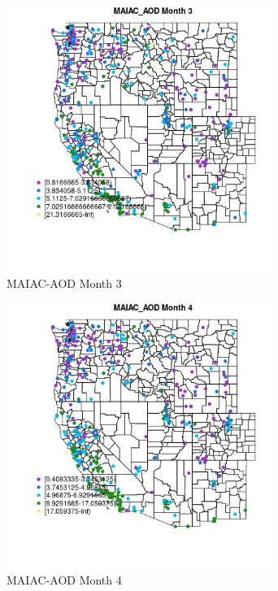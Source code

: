 \begin{figure} 
\centering  
\includegraphics[width=0.77\textwidth]{Code_Outputs/ML_input_report_ML_input_PM25_Step5_part_d_de_duplicated_aves_ML_input_MapObsMo3MAIAC_AOD.jpg} 
\caption{\label{fig:ML_input_report_ML_input_PM25_Step5_part_d_de_duplicated_aves_ML_inputMapObsMo3MAIAC_AOD}MAIAC-AOD Month 3} 
\end{figure} 
 

\begin{figure} 
\centering  
\includegraphics[width=0.77\textwidth]{Code_Outputs/ML_input_report_ML_input_PM25_Step5_part_d_de_duplicated_aves_ML_input_MapObsMo4MAIAC_AOD.jpg} 
\caption{\label{fig:ML_input_report_ML_input_PM25_Step5_part_d_de_duplicated_aves_ML_inputMapObsMo4MAIAC_AOD}MAIAC-AOD Month 4} 
\end{figure} 
 

